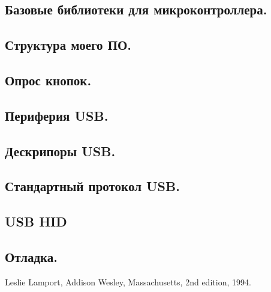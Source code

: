 \documentclass[12pt,a4paper]{scrbook} %
\begin{document}
    \subsection{Базовые библиотеки для микроконтроллера.}
    \subsection{Структура моего ПО.}
    \subsection{Опрос кнопок.}
    \subsection{Периферия USB.}
    \subsection{Дескрипоры USB.}
    \subsection{Стандартный протокол USB.}
    \subsection{USB HID}
    \subsection{Отладка.}



\begin{thebibliography}{9}

  Leslie Lamport,
  Addison Wesley, Massachusetts,
  2nd edition,
  1994.

\end{thebibliography}
\end{document}
